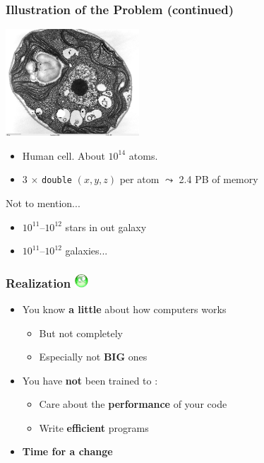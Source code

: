 \documentclass[xcolor={x11names,svgnames,psnames}]{beamer}
\newcommand{\triste}{\includegraphics[width=0.5cm,trim=0 17mm 0 0]{triste}}
\newcommand{\red}{\alert}
\begin{document}

\begin{frame}
\frametitle{Illustration of the Problem (continued)}

\begin{center}
\includegraphics[width=5cm]{cell.jpg}
\end{center}

\begin{itemize}
\item Human cell. About $10^{14}$ atoms.
\item 3 $\times$ \texttt{double} $(x, y, z)$ per atom $\leadsto$ 2.4 PB of memory
\end{itemize}

\medskip

\begin{alertblock}{Not to mention...}
  \begin{itemize}
  \item $10^{11}$--$10^{12}$ stars in out galaxy
  \item $10^{11}$--$10^{12}$ galaxies...
  \end{itemize}
\end{alertblock}

\end{frame}



\begin{frame}
  \frametitle{Realization \triste}

  \begin{itemize}
  \item You know \textbf{a little} about how computers works
    \begin{itemize}
    \item But \red{not completely}
    \item Especially not \textbf{BIG} ones
    \end{itemize}

    \medskip
    
  \item You have \textbf{not} been trained to :
    \begin{itemize}
    \item \red{Care} about the \textbf{performance} of your code
    \item Write \textbf{efficient} programs
    \end{itemize}
    
    \pause
    \bigskip

    \item \Huge \textbf{Time for a change}
    \end{itemize}

\end{frame}
\end{document}

